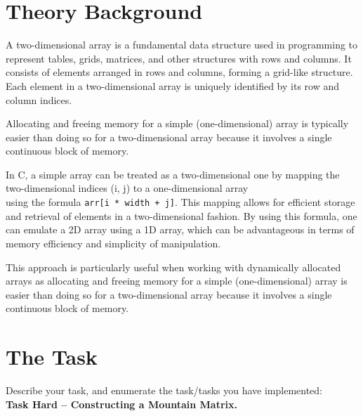 \documentclass[12pt]{article}
\begin{document}
\setcounter{page}{2}
\pagestyle{fancy}
\fancyhf{}
\rhead{\thepage}

\section*{Theory Background}
A two-dimensional array is a fundamental data structure used in programming to represent tables, grids, matrices, and other structures with rows and columns. It consists of elements arranged in rows and columns, forming a grid-like structure. Each element in a two-dimensional array is uniquely identified by its row and column indices.

Allocating and freeing memory for a simple (one-dimensional) array is typically easier than doing so for a two-dimensional array because it involves a single continuous block of memory.

In C, a simple array can be treated as a two-dimensional one by mapping the two-dimensional indices (i, j) to a one-dimensional array\\
using the formula \texttt{arr[i * width + j]}\cite{arr_param}. This mapping allows for efficient storage and retrieval of elements in a two-dimensional fashion. By using this formula, one can emulate a 2D array using a 1D array, which can be advantageous in terms of memory efficiency and simplicity of manipulation.

This approach is particularly useful when working with dynamically allocated arrays as allocating and freeing memory for a simple (one-dimensional) array is easier than doing so for a two-dimensional array because it involves a single continuous block of memory.


\section*{The Task}

Describe your task, and enumerate the task/tasks you have implemented:\\
\textbf{Task Hard -- Constructing a Mountain Matrix.}
\end{document}

